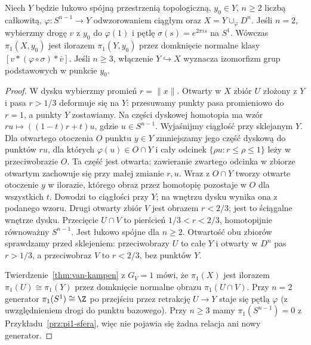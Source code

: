 \begin{twierdzenie}
\label{thm:pi1-dolaczenie-komorki}
Niech $Y$ będzie łukowo spójną przestrzenią topologiczną,
$y_0\in Y$, $n\geq2$ liczbą całkowitą,
$\varphi:S^{n-1}\to Y$ odwzorowaniem ciągłym
oraz $X=Y\cup_\varphi D^n$.
Jeśli $n=2$, wybierzmy drogę $v$ z $y_0$ do
$\varphi(1)$ i pętlę $\sigma(s)=e^{2\pi i s}$
na $S^1$. Wówczas $\pi_1(X,y_0)$ jest ilorazem
$\pi_1(Y,y_0)$ przez domknięcie normalne
klasy $[v*(\varphi\circ\sigma)*\bar v]$.
Jeśli $n\geq3$, włączenie
$Y\hookrightarrow X$ wyznacza
izomorfizm grup podstawowych w punkcie $y_0$.
\end{twierdzenie}
\begin{proof}
W dysku wybierzmy promień $r=\|x\|$.
Otwarty w $X$ zbiór $U$ złożony
z $Y$ i pasa $r>1/3$ deformuje
się na $Y$: przesuwamy punkty
pasa promieniowo do $r=1$,
a punkty $Y$ zostawiamy. Na części dyskowej homotopia ma wzór
$ru\mapsto((1-t)r+t)u$, gdzie $u\in S^{n-1}$.
Wyjaśnijmy ciągłość przy sklejanym $Y$. Dla otwartego otoczenia
$O$ punktu $y\in Y$ zmniejszamy jego część dyskową do punktów $ru$,
dla których $\varphi(u)\in O\cap Y$ i cały odcinek
$\{\rho u:r\leq\rho\leq1\}$ leży w przeciwobrazie $O$.
Ta część jest otwarta: zawieranie zwartego odcinka w zbiorze
otwartym zachowuje się przy małej zmianie $r,u$.
Wraz z $O\cap Y$ tworzy otwarte otoczenie $y$ w ilorazie,
którego obraz przez homotopię pozostaje w $O$ dla wszystkich $t$.
Dowodzi to ciągłości przy $Y$; na wnętrzu dysku wynika ona z podanego wzoru.
Drugi otwarty zbiór $V$ jest
obrazem $r<2/3$; jest to
ściągalne wnętrze dysku.
Przecięcie $U\cap V$ to pierścień
$1/3<r<2/3$, homotopijnie
równoważny $S^{n-1}$.
Jest łukowo spójne dla $n\geq2$.
Otwartość obu zbiorów sprawdzamy przed sklejeniem:
przeciwobrazy $U$ to całe $Y$ i otwarty w $D^n$ pas $r>1/3$,
a przeciwobraz $V$ to $r<2/3$, bez punktów $Y$.

Twierdzenie~\ref{thm:van-kampen}
z $G_V=1$ mówi, że $\pi_1(X)$
jest ilorazem $\pi_1(U)\cong\pi_1(Y)$
przez domknięcie normalne obrazu
$\pi_1(U\cap V)$. Przy $n=2$
generator $\pi_1(S^1)\cong\Z$
po przejściu przez retrakcję
$U\to Y$ staje się pętlą
$\varphi$ (z uwzględnieniem
drogi do punktu bazowego).
Przy $n\geq3$ mamy
$\pi_1(S^{n-1})=0$ z
Przykładu~\ref{prz:pi1-sfera},
więc nie pojawia się żadna
relacja ani nowy generator.
\end{proof}

